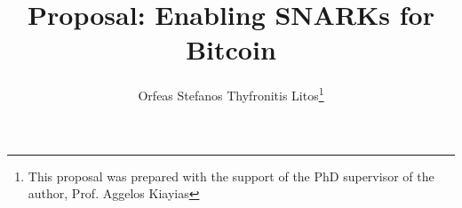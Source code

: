 \title{Proposal: Enabling SNARKs for Bitcoin}
\author{Orfeas Stefanos Thyfronitis Litos\thanks{This proposal was
prepared with the support of the PhD supervisor of the author, Prof. Aggelos
Kiayias}}
\maketitle
